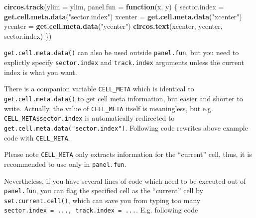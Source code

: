 \documentclass[]{book}
\newenvironment{Shaded}{\begin{snugshade}}{\end{snugshade}}
\newcommand{\KeywordTok}[1]{\textcolor[rgb]{0.13,0.29,0.53}{\textbf{#1}}}
\newcommand{\DataTypeTok}[1]{\textcolor[rgb]{0.13,0.29,0.53}{#1}}
\newcommand{\StringTok}[1]{\textcolor[rgb]{0.31,0.60,0.02}{#1}}
\newcommand{\ControlFlowTok}[1]{\textcolor[rgb]{0.13,0.29,0.53}{\textbf{#1}}}
\newcommand{\OperatorTok}[1]{\textcolor[rgb]{0.81,0.36,0.00}{\textbf{#1}}}
\newcommand{\NormalTok}[1]{#1}
\theoremstyle{definition}
\theoremstyle{definition}
\theoremstyle{remark}
\begin{document}
\begin{Shaded}
\begin{Highlighting}[]
\KeywordTok{circos.track}\NormalTok{(}\DataTypeTok{ylim =}\NormalTok{ ylim, }\DataTypeTok{panel.fun =} \ControlFlowTok{function}\NormalTok{(x, y) \{}
\NormalTok{    sector.index =}\StringTok{ }\KeywordTok{get.cell.meta.data}\NormalTok{(}\StringTok{"sector.index"}\NormalTok{)}
\NormalTok{    xcenter =}\StringTok{ }\KeywordTok{get.cell.meta.data}\NormalTok{(}\StringTok{"xcenter"}\NormalTok{)}
\NormalTok{    ycenter =}\StringTok{ }\KeywordTok{get.cell.meta.data}\NormalTok{(}\StringTok{"ycenter"}\NormalTok{)}
    \KeywordTok{circos.text}\NormalTok{(xcenter, ycenter, sector.index)}
\NormalTok{\})}
\end{Highlighting}
\end{Shaded}

\texttt{get.cell.meta.data()} can also be used outside
\texttt{panel.fun}, but you need to explictly specify
\texttt{sector.index} and \texttt{track.index} arguments unless the
current index is what you want.

There is a companion variable \texttt{CELL\_META} which is identical to
\texttt{get.cell.meta.data()} to get cell meta information, but easier
and shorter to write. Actually, the value of \texttt{CELL\_META} itself
is meaningless, but e.g. \texttt{CELL\_META\$sector.index} is
automatically redirected to \texttt{get.cell.meta.data("sector.index")}.
Following code rewrites above example code with \texttt{CELL\_META}.

\begin{Shaded}
\end{Shaded}

Please note \texttt{CELL\_META} only extracts information for the
``current'' cell, thus, it is recommended to use only in
\texttt{panel.fun}.

Nevertheless, if you have several lines of code which need to be
executed out of \texttt{panel.fun}, you can flag the specified cell as
the ``current'' cell by \texttt{set.current.cell()}, which can save you
from typing too many
\texttt{sector.index\ =\ ...,\ track.index\ =\ ...}. E.g. following code
\end{document}
